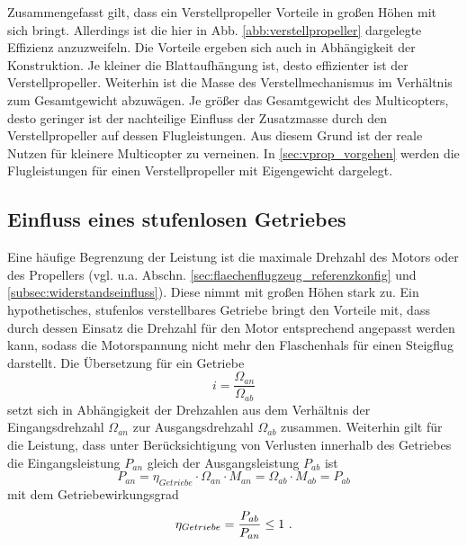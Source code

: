 Zusammengefasst gilt, dass ein Verstellpropeller Vorteile in großen Höhen mit sich bringt. Allerdings ist die hier in Abb. \ref{abb:verstellpropeller} dargelegte Effizienz anzuzweifeln. Die Vorteile ergeben sich auch in Abhängigkeit der Konstruktion. Je kleiner die Blattaufhängung ist, desto effizienter ist der Verstellpropeller. Weiterhin ist die Masse des Verstellmechanismus im Verhältnis zum Gesamtgewicht abzuwägen. Je größer das Gesamtgewicht des Multicopters, desto geringer ist der nachteilige Einfluss der Zusatzmasse durch den Verstellpropeller auf dessen Flugleistungen. Aus diesem Grund ist der reale Nutzen für kleinere Multicopter zu verneinen. 
In \ref{sec:vprop_vorgehen} werden die Flugleistungen für einen Verstellpropeller mit Eigengewicht dargelegt. 



\subsection{Einfluss eines stufenlosen Getriebes}
\label{subsec:getriebe}
Eine häufige Begrenzung der Leistung ist die maximale Drehzahl des Motors oder des Propellers (vgl. u.a. Abschn. \ref{sec:flaechenflugzeug_referenzkonfig} und \ref{subsec:widerstandseinfluss}). Diese nimmt mit großen Höhen stark zu. Ein hypothetisches, stufenlos verstellbares Getriebe bringt den Vorteile mit, dass durch dessen Einsatz die Drehzahl für den Motor entsprechend angepasst werden kann, sodass die Motorspannung nicht mehr den Flaschenhals für einen Steigflug darstellt.
Die Übersetzung für ein Getriebe 
\begin{equation}
	i = \frac{\Omega_{an}}{\Omega_{ab}} 
	\label{eq:getriebe_uebersetzung}
\end{equation}
setzt sich in Abhängigkeit der Drehzahlen aus dem Verhältnis der Eingangsdrehzahl \ensuremath{\Omega_{an}} zur Ausgangsdrehzahl \ensuremath{\Omega_{ab}} zusammen. Weiterhin gilt für die Leistung, dass unter Berücksichtigung von Verlusten innerhalb des Getriebes die Eingangsleistung \ensuremath{P_{an}} gleich der Ausgangsleistung \ensuremath{P_{ab}} ist
\begin{equation}
	P_{an} = \eta_{Getriebe} \cdot \Omega_{an}\cdot M_{an} = \Omega_{ab}\cdot M_{ab} = P_{ab}
	\label{eq:getriebe_leistung}
\end{equation} 
mit dem Getriebewirkungsgrad 
\begin{equation}
	\eta_{Getriebe} = \frac{P_{ab}}{P_{an}} \leq 1 ~\text{.}
	\label{eq:getriebe_wirkungsgrad}
\end{equation}
